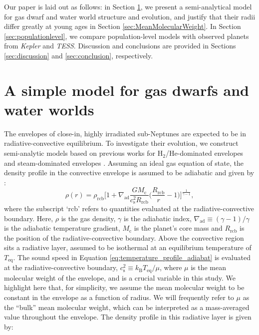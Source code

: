 \documentclass[fleqn,usenatbib]{mnras}
\begin{document}
Our paper is laid out as follows: in Section \ref{sec:modelmethod}, we present a semi-analytical model for gas dwarf and water world structure and evolution, and justify that their radii differ greatly at young ages in Section \ref{sec:MeanMolecularWeight}. In Section \ref{sec:populationlevel}, we compare population-level models with observed planets from \textit{Kepler} and \textit{TESS}. Discussion and conclusions are provided in Sections \ref{sec:discussion} and \ref{sec:conclusion}, respectively.


\section{A simple model for gas dwarfs and water worlds} \label{sec:modelmethod}
The envelopes of close-in, highly irradiated sub-Neptunes are expected to be in radiative-convective equilibrium. To investigate their evolution, we construct semi-analytic models based on previous works for H$_2$/He-dominated envelopes \citep[e.g.][]{Owen2017,Gupta2019,Misener2021} and steam-dominated envelopes \citep{Rogers2025}. Assuming an ideal gas equation of state, the density profile in the convective envelope is assumed to be adiabatic and given by \citep[e.g.][]{Ginzburg2016}:
\begin{equation} \label{eq:temperature_profile_adiabat}
    \rho(r) = \rho_\text{rcb}  \bigg[ 1 + \nabla_\text{ad} \frac{G M_\text{c}}{c_\text{s}^2 R_\text{rcb}} \bigg( \frac{R_\text{rcb}}{r} - 1 \bigg) \bigg]^{\frac{1}{\gamma - 1}},
\end{equation}
where the subscript `rcb' refers to quantities evaluated at the radiative-convective boundary. Here,  $\rho$ is the gas density, $\gamma$ is the adiabatic index, $\nabla_\text{ad} \equiv (\gamma - 1) / \gamma$ is the adiabatic temperature gradient, $M_\text{c}$ is the planet's core mass and $R_\text{rcb}$ is the position of the radiative-convective boundary. Above the convective region sits a radiative layer, assumed to be isothermal at an equilibrium temperature of $T_\text{eq}$. The sound speed in Equation \ref{eq:temperature_profile_adiabat} is evaluated at the radiative-convective boundary, $c_\text{s}^2 \equiv k_\text{B} T_\text{eq} / \mu$, where $\mu$ is the mean molecular weight of the envelope, and is a crucial variable in this study. We highlight here that, for simplicity, we assume the mean molecular weight to be constant in the envelope as a function of radius. We will frequently refer to $\mu$ as the ``bulk'' mean molecular weight, which can be interpreted as a mass-averaged value throughout the envelope. The density profile in this radiative layer is given by:
\end{document}
